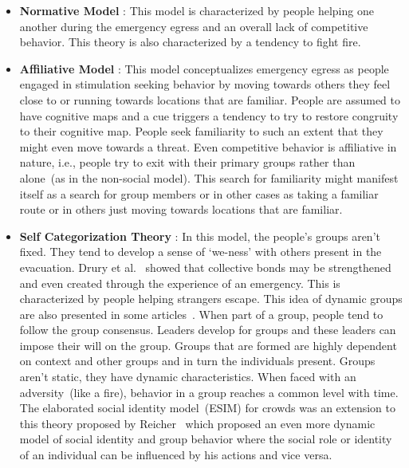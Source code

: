 \begin{itemize}
\item {\bf Normative Model }: This model is characterized by people helping one another during the emergency egress and an overall lack of competitive behavior. This theory is also characterized by a tendency to fight fire.

\item {\bf Affiliative Model }: This model conceptualizes emergency egress as people engaged in stimulation seeking behavior by moving towards others they feel close to or running towards locations that are familiar. People are assumed to have cognitive maps and a cue triggers a tendency to try to restore congruity to their cognitive map. People seek familiarity to such an extent that they might even move towards a threat. Even competitive behavior is affiliative in nature, i.e., people try to exit with their primary groups rather than alone~(as in the non-social model). This search for familiarity might manifest itself as a search for group members or in other cases as taking a familiar route or in others just moving towards locations that are familiar.

\item {\bf Self Categorization Theory }: In this model, the people's groups aren't fixed. They tend to develop a sense of `we-ness' with others present in the evacuation. Drury et al.~\cite{Drury:2009ga} showed that collective bonds may be strengthened and even created through the experience of an emergency. This is characterized by people helping strangers escape. This idea of dynamic groups are also presented in some articles~\cite{Aveni:1997wq,Reicher:2008ep,Cocking:2007wp,Cocking:2008vv}. When part of a group, people tend to follow the group consensus. Leaders develop for groups and these leaders can impose their will on the group. Groups that are formed are highly dependent on context and other groups and in turn the individuals present. Groups aren't static, they have dynamic characteristics. When faced with an adversity~(like a fire), behavior in a group reaches a common level with time. The elaborated social identity model~(ESIM) for crowds was an extension to this theory proposed by Reicher~\cite{Reicher:2008ep} which proposed an even more dynamic model of social identity and group behavior where the social role or identity of an individual can be influenced by his actions and vice versa.
\end{itemize}

